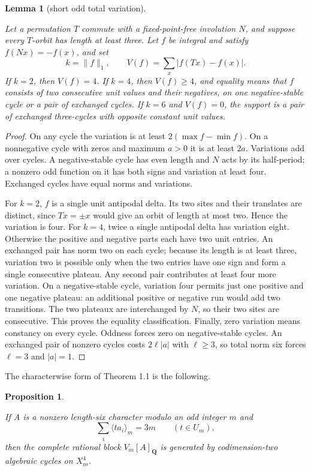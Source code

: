 \documentclass[11pt]{amsart}
\numberwithin{theorem}{section}
\newtheorem{proposition}[theorem]{Proposition}
\newtheorem{lemma}[theorem]{Lemma}
\theoremstyle{remark}
\numberwithin{equation}{section}
\begin{document}
\begin{lemma}[short odd total variation]\label{lemma:2.5}

Let a permutation \(T\) commute with a fixed-point-free involution \(N\),
and suppose every \(T\)-orbit has length at least three. Let \(f\) be
integral and satisfy \(f(Nx)=-f(x)\), and set
\[
k=\|f\|_1,\qquad V(f)=\sum_x|f(Tx)-f(x)|.
\]
If \(k=2\), then \(V(f)=4\). If \(k=4\), then \(V(f)\ge4\), and equality
means that \(f\) consists of two consecutive unit values and their negatives,
on one negative-stable cycle or a pair of exchanged cycles. If \(k=6\) and
\(V(f)=0\), the support is a pair of exchanged three-cycles with opposite
constant unit values.

\end{lemma}
\begin{proof}

On any cycle the variation is at least \(2(\max f-\min f)\). On a
nonnegative cycle with zeros and maximum \(a>0\) it is at least \(2a\).
Variations add over cycles. A negative-stable cycle has even length and
\(N\) acts by its half-period; a nonzero odd function on it has both signs
and variation at least four. Exchanged cycles have equal norms and variations.

For \(k=2\), \(f\) is a single unit antipodal delta. Its two sites and their
translates are distinct, since \(Tx=\pm x\) would give an orbit of length
at most two. Hence the variation is four. For \(k=4\), twice a single
antipodal delta has variation eight. Otherwise the positive and negative
parts each have two unit entries. An exchanged pair has norm two on each
cycle; because its length is at least three, variation two is possible
only when the two entries have one sign and form a single consecutive
plateau. Any second pair contributes at least four more variation. On a
negative-stable cycle, variation four permits just one positive and one
negative plateau: an additional positive or negative run would add two
transitions. The two plateaux are interchanged by \(N\), so their two
sites are consecutive. This proves the equality classification. Finally,
zero variation means constancy on every cycle. Oddness forces zero on
negative-stable cycles. An exchanged pair of nonzero cycles costs
\(2\ell|a|\) with \(\ell\ge3\), so total norm six forces \(\ell=3\) and
\(|a|=1\).
\end{proof}

The characterwise form of Theorem 1.1 is the following.

\begin{proposition}\label{proposition:2.6}

If \(A\) is a nonzero length-six character modulo an odd integer \(m\) and
\[
\sum_i\langle ta_i\rangle_m=3m
\qquad(t\in U_m),
\]
then the complete rational block \(V_m[A]_{\mathbf Q}\) is generated by
codimension-two algebraic cycles on \(X_m^4\).

\end{proposition}
\end{document}
